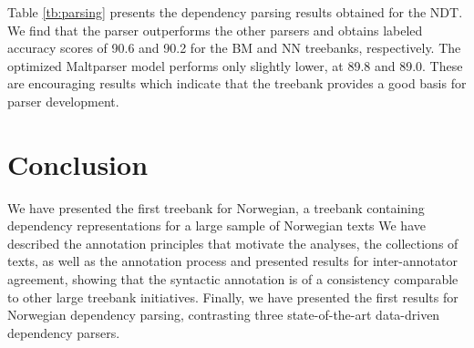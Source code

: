 \documentclass[11pt,a4paper]{article}
\begin{document}
Table \ref{tb:parsing} presents the dependency parsing results
obtained for the NDT. We find that the  parser
outperforms the other parsers and obtains labeled accuracy scores of
90.6 and 90.2 for the BM and NN treebanks, respectively.  The
optimized Maltparser model performs only slightly lower, at 89.8 and
89.0.  These are encouraging results which indicate that the treebank
provides a good basis for parser development.

\section{Conclusion}
We have presented the first treebank for Norwegian, a treebank
containing dependency representations for a large sample of Norwegian
texts
We have described the
annotation principles that motivate the analyses, the collections of
texts, as well as the annotation process and presented results for
inter-annotator agreement, showing that the syntactic annotation is of
a consistency comparable to other large treebank initiatives. Finally,
we have presented the first results for Norwegian dependency parsing,
contrasting three state-of-the-art data-driven dependency parsers.


\clearpage

\end{document}
